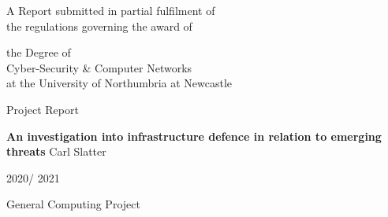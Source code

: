 
\begin{titlepage}
\Large
A Report submitted in partial fulfilment of\\
 the regulations governing the award of
\par
the Degree of\\[5mm]
{\huge	 Cyber-Security \& Computer Networks}\\[5mm]
at the University of Northumbria at Newcastle
\par
\vspace*{1in}
{\large Project Report}
\par\vspace{1em}
\textbf{An investigation into infrastructure defence in relation to emerging threats}
\vfill
Carl Slatter
\par\vspace{1em}
2020/ 2021
\par\vspace{1em}
General Computing Project
\end{titlepage}
